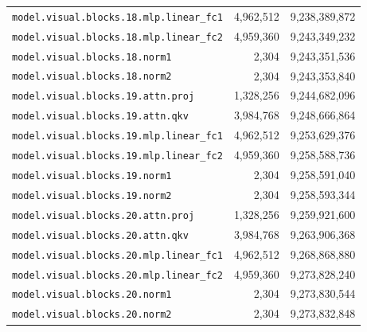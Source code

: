 \documentclass[10pt,a4paper]{article}
\theoremstyle{definition}
\begin{document}
\begin{appendices}
\begin{longtable}{p{9.5cm}rr}
\texttt{model.\allowbreak{}visual.\allowbreak{}blocks.\allowbreak{}18.\allowbreak{}mlp.\allowbreak{}linear\_fc1} & 4,962,512 & 9,238,389,872 \\
\texttt{model.\allowbreak{}visual.\allowbreak{}blocks.\allowbreak{}18.\allowbreak{}mlp.\allowbreak{}linear\_fc2} & 4,959,360 & 9,243,349,232 \\
\texttt{model.\allowbreak{}visual.\allowbreak{}blocks.\allowbreak{}18.\allowbreak{}norm1} & 2,304 & 9,243,351,536 \\
\texttt{model.\allowbreak{}visual.\allowbreak{}blocks.\allowbreak{}18.\allowbreak{}norm2} & 2,304 & 9,243,353,840 \\
\texttt{model.\allowbreak{}visual.\allowbreak{}blocks.\allowbreak{}19.\allowbreak{}attn.\allowbreak{}proj} & 1,328,256 & 9,244,682,096 \\
\texttt{model.\allowbreak{}visual.\allowbreak{}blocks.\allowbreak{}19.\allowbreak{}attn.\allowbreak{}qkv} & 3,984,768 & 9,248,666,864 \\
\texttt{model.\allowbreak{}visual.\allowbreak{}blocks.\allowbreak{}19.\allowbreak{}mlp.\allowbreak{}linear\_fc1} & 4,962,512 & 9,253,629,376 \\
\texttt{model.\allowbreak{}visual.\allowbreak{}blocks.\allowbreak{}19.\allowbreak{}mlp.\allowbreak{}linear\_fc2} & 4,959,360 & 9,258,588,736 \\
\texttt{model.\allowbreak{}visual.\allowbreak{}blocks.\allowbreak{}19.\allowbreak{}norm1} & 2,304 & 9,258,591,040 \\
\texttt{model.\allowbreak{}visual.\allowbreak{}blocks.\allowbreak{}19.\allowbreak{}norm2} & 2,304 & 9,258,593,344 \\
\texttt{model.\allowbreak{}visual.\allowbreak{}blocks.\allowbreak{}20.\allowbreak{}attn.\allowbreak{}proj} & 1,328,256 & 9,259,921,600 \\
\texttt{model.\allowbreak{}visual.\allowbreak{}blocks.\allowbreak{}20.\allowbreak{}attn.\allowbreak{}qkv} & 3,984,768 & 9,263,906,368 \\
\texttt{model.\allowbreak{}visual.\allowbreak{}blocks.\allowbreak{}20.\allowbreak{}mlp.\allowbreak{}linear\_fc1} & 4,962,512 & 9,268,868,880 \\
\texttt{model.\allowbreak{}visual.\allowbreak{}blocks.\allowbreak{}20.\allowbreak{}mlp.\allowbreak{}linear\_fc2} & 4,959,360 & 9,273,828,240 \\
\texttt{model.\allowbreak{}visual.\allowbreak{}blocks.\allowbreak{}20.\allowbreak{}norm1} & 2,304 & 9,273,830,544 \\
\texttt{model.\allowbreak{}visual.\allowbreak{}blocks.\allowbreak{}20.\allowbreak{}norm2} & 2,304 & 9,273,832,848 \\

\end{longtable}
\end{appendices}
\end{document}
